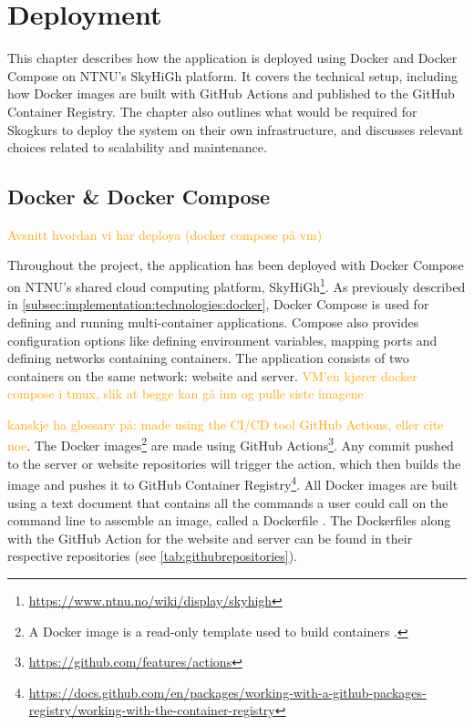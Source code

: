 \chapter{Deployment}\label{chap:deployment}

This chapter describes how the application is deployed using Docker and Docker Compose on NTNU’s SkyHiGh platform. It covers the technical setup, including how Docker images are built with GitHub Actions and published to the GitHub Container Registry. The chapter also outlines what would be required for Skogkurs to deploy the system on their own infrastructure, and discusses relevant choices related to scalability and maintenance.

\section{Docker \& Docker Compose}

\textcolor{orange}{Avsnitt hvordan vi har deploya (docker compose på vm)}

Throughout the project, the application has been deployed with Docker Compose on NTNU's shared cloud computing platform, SkyHiGh\footnote{\url{https://www.ntnu.no/wiki/display/skyhigh}}. As previously described in \autoref{subsec:implementation:technologies:docker}, Docker Compose is used for defining and running multi-container applications. Compose also provides configuration options like defining environment variables, mapping ports and defining networks containing containers. The application consists of two containers on the same network: website and server. \textcolor{orange}{VM'en kjører docker compose i tmux, slik at begge kan gå inn og pulle siste imagene}

\textcolor{orange}{kanskje ha glossary på: made using the CI/CD tool GitHub Actions, eller cite noe}.
The Docker images\footnote{A Docker image is a read-only template used to build containers \cite{dockerwikipedia}.} are made using GitHub Actions\footnote{\url{https://github.com/features/actions}}. Any commit pushed to the server or website repositories will trigger the action, which then builds the image and pushes it to GitHub Container Registry\footnote{\url{https://docs.github.com/en/packages/working-with-a-github-packages-registry/working-with-the-container-registry}}. All Docker images are built using a text document that contains all the commands a user could call on the command line to assemble an image, called a Dockerfile \cite{dockerfiledocs}. The Dockerfiles along with the GitHub Action for the website and server can be found in their respective repositories (see \autoref{tab:githubrepositories}).

